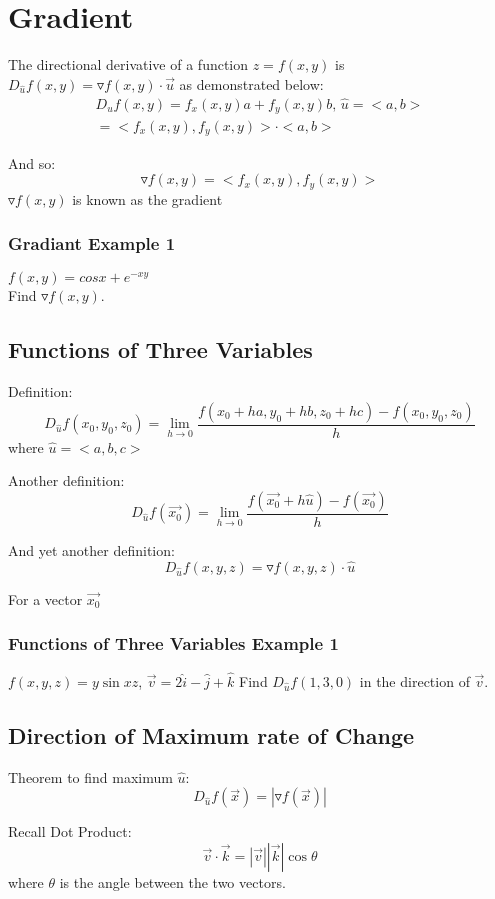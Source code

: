 \documentclass[12pt]{article}
\begin{document}
\section{Gradient}
The directional derivative of a function \(z=f(x,y)\) is \(D_{\hat{u}}f(x,y) = \triangledown f(x,y) \cdot \vec{u} \)
as demonstrated below:
\begin{align*}
	D_{\hat{u}}f(x,y) = f_x(x,y)a + f_y(x,y)b \text{, } \hat{u} = <a,b>\\
	= <f_x(x,y), f_y(x,y)> \cdot <a,b>
\end{align*}

And so: 
\[
	\triangledown f(x,y) = <f_x(x,y),f_y(x,y)>
\]
\(\triangledown f(x,y)\) is known as the gradient 

\subsubsection{Gradiant Example 1}
\(f(x,y) = cosx + e^{-xy}\)\\ 
Find \(\triangledown f(x,y)\).

\subsection{Functions of Three Variables}
Definition:
\[
	D_{\hat{u}}f(x_0,y_0,z_0) = \lim_{h \to 0} \frac{f(x_0+ha,y_0+hb,z_0+hc) - f(x_0,y_0,z_0)}{h}
\]
where \(\hat{u} = <a,b,c>\)

Another definition:
\[
	D_{\hat{u}}f(\vec{x_0}) = \lim_{h \to 0} \frac{f(\vec{x_0} + h\hat{u}) - f(\vec{x_0} )}{h}
\]

And yet another definition:
\[
	D_{\hat{u}}f(x,y,z) = \triangledown f(x,y,z) \cdot \hat{u}
\]

For a vector \(\vec{x_0} \)

\subsubsection{Functions of Three Variables Example 1}
\(f(x,y,z) = y\sin{xz}\), \(\vec{v} = 2\hat{i} - \hat{j} + \hat{k}\)
Find \(D_{\hat{u}}f(1,3,0) \) in the direction of \(\vec{v} \).

\subsection{Direction of Maximum rate of Change}
Theorem to find maximum \(\hat{u}\):
\[
	D_{\hat{u}}f(\vec{x} ) = |\triangledown f(\vec{x} )|
\]

Recall Dot Product:
\[
	\vec{v} \cdot \vec{k} = |\vec{v} | |\vec{k} | \cos{\theta}	
\]
where \(\theta\) is the angle between the two vectors.
\end{document}
